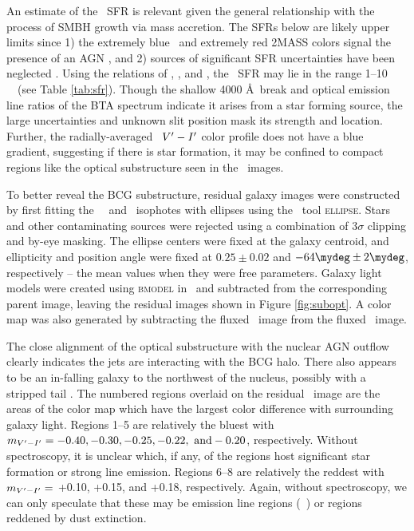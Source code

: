 \documentclass[11pt, preprint]{aastex}
\begin{document}
An estimate of the \rbs\ SFR is relevant given the general
relationship with the process of SMBH growth via mass accretion. The
SFRs below are likely upper limits since 1) the extremely blue
\galex\ and extremely red 2MASS colors signal the presence of an AGN
\citep[\eg][]{2005AJ....130.1022A}, and 2) sources of significant SFR
uncertainties have been neglected \citep[\eg][]{1992ApJ...388..310K,
  2004AJ....127.2002K, hicksuv, 2010MNRAS.tmp..626G}. Using the
relations of \citet{kennicutt2}, \citet{2006ApJ...642..775M}, and
\citet{salim2007}, the \rbs\ SFR may lie in the range 1--10
~\msolpy\ (see Table \ref{tab:sfr}). Though the shallow 4000
\AA\ break and optical emission line ratios of the BTA spectrum
indicate it arises from a star forming source, the large uncertainties
and unknown slit position mask its strength and location. Further, the
radially-averaged \hst\ $V^{\prime}-I^{\prime}$ color profile does not have a blue
gradient, suggesting if there is star formation, it may be confined to
compact regions like the optical substructure seen in the
\hst\ images.

To better reveal the BCG substructure, residual galaxy images were
constructed by first fitting the \hst\ \myv\ and \myi\ isophotes with
ellipses using the \iraf\ tool {\textsc{ellipse}}. Stars and other
contaminating sources were rejected using a combination of $3\sigma$
clipping and by-eye masking. The ellipse centers were fixed at the
galaxy centroid, and ellipticity and position angle were fixed at
$0.25 \pm 0.02$ and $-64\mydeg \pm 2\mydeg$, respectively -- the mean
values when they were free parameters. Galaxy light models were
created using {\textsc{bmodel}} in \iraf\ and subtracted from the
corresponding parent image, leaving the residual images shown in
Figure \ref{fig:subopt}. A color map was also generated by subtracting
the fluxed \myi\ image from the fluxed \myv\ image.

The close alignment of the optical substructure with the nuclear AGN
outflow clearly indicates the jets are interacting with the BCG
halo. There also appears to be an in-falling galaxy to the northwest
of the nucleus, possibly with a stripped tail \citep[see][for an
  example]{2007ApJ...671..190S}. The numbered regions overlaid on the
residual \myv\ image are the areas of the color map which have the
largest color difference with surrounding galaxy light. Regions 1--5
are relatively the bluest with $m_{V^{\prime}-I^{\prime}} = -0.40, -0.30, -0.25,
-0.22, ~\rm{and} -0.20$, respectively. Without spectroscopy, it is
unclear which, if any, of the regions host significant star formation
or strong line emission. Regions 6--8 are relatively the reddest with
$m_{V^{\prime}-I^{\prime}} =$ +0.10, +0.15, and +0.18, respectively. Again,
without spectroscopy, we can only speculate that these may be emission
line regions (\eg\ \halpha) or regions reddened by dust extinction.
\end{document}
